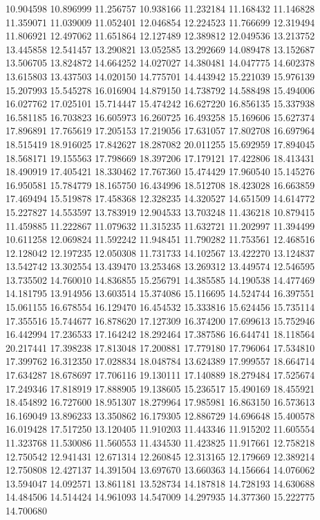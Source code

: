 10.904598
10.896999
11.256757
10.938166
11.232184
11.168432
11.146828
11.359071
11.039009
11.052401
12.046854
12.224523
11.766699
12.319494
11.806921
12.497062
11.651864
12.127489
12.389812
12.049536
13.213752
13.445858
12.541457
13.290821
13.052585
13.292669
14.089478
13.152687
13.506705
13.824872
14.664252
14.027027
14.380481
14.047775
14.602378
13.615803
13.437503
14.020150
14.775701
14.443942
15.221039
15.976139
15.207993
15.545278
16.016904
14.879150
14.738792
14.588498
15.494006
16.027762
17.025101
15.714447
15.474242
16.627220
16.856135
15.337938
16.581185
16.703823
16.605973
16.260725
16.493258
15.169606
15.627374
17.896891
17.765619
17.205153
17.219056
17.631057
17.802708
16.697964
18.515419
18.916025
17.842627
18.287082
20.011255
15.692959
17.894045
18.568171
19.155563
17.798669
18.397206
17.179121
17.422806
18.413431
18.490919
17.405421
18.330462
17.767360
15.474429
17.960540
15.145276
16.950581
15.784779
18.165750
16.434996
18.512708
18.423028
16.663859
17.469494
15.519878
17.458368
12.328235
14.320527
14.651509
14.614772
15.227827
14.553597
13.783919
12.904533
13.703248
11.436218
10.879415
11.459885
11.222867
11.079632
11.315235
11.632721
11.202997
11.394499
10.611258
12.069824
11.592242
11.948451
11.790282
11.753561
12.468516
12.128042
12.197235
12.050308
11.731733
14.102567
13.422270
13.124837
13.542742
13.302554
13.439470
13.253468
13.269312
13.449574
12.546595
13.735502
14.760010
14.836855
15.256791
14.385585
14.190538
14.477469
14.181795
13.914956
13.603514
15.374086
15.116695
14.524744
16.397551
15.061155
16.678554
16.129470
16.454532
15.333816
15.624456
15.735114
17.355516
15.744677
16.878620
17.127309
16.374200
17.699613
15.752946
16.442994
17.236533
17.164242
18.292464
17.387586
16.644741
18.118564
20.217441
17.398238
17.813048
17.200881
17.779180
17.796064
17.534810
17.399762
16.312350
17.028834
18.048784
13.624389
17.999557
18.664714
17.634287
18.678697
17.706116
19.130111
17.140889
18.279484
17.525674
17.249346
17.818919
17.888905
19.138605
15.236517
15.490169
18.455921
18.454892
16.727600
18.951307
18.279964
17.985981
16.863150
16.573613
16.169049
13.896233
13.350862
16.179305
12.886729
14.696648
15.400578
16.019428
17.517250
13.120405
11.910203
11.443346
11.915202
11.605554
11.323768
11.530086
11.560553
11.434530
11.423825
11.917661
12.758218
12.750542
12.941431
12.671314
12.260845
12.313165
12.179669
12.389214
12.750808
12.427137
14.391504
13.697670
13.660363
14.156664
14.076062
13.594047
14.092571
13.861181
13.528734
14.187818
14.728193
14.630688
14.484506
14.514424
14.961093
14.547009
14.297935
14.377360
15.222775
14.700680
